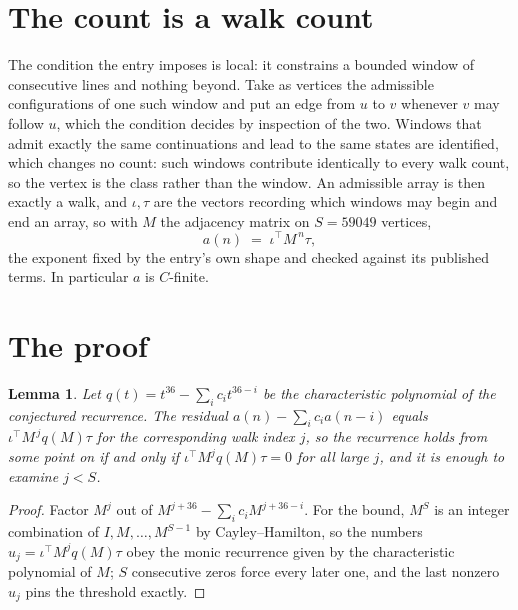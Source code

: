 \documentclass[11pt,a4paper]{article}
\theoremstyle{plain}
\newtheorem{lemma}[theorem]{Lemma}
\theoremstyle{definition}
\begin{document}
\section{The count is a walk count}

The condition the entry imposes is local: it constrains a bounded window of consecutive lines and nothing beyond. Take as vertices the admissible configurations of one such window and put an edge from $u$ to $v$ whenever $v$ may follow $u$, which the condition decides by inspection of the two. Windows that admit exactly the same continuations and lead to the same states are identified, which changes no count: such windows contribute identically to every walk count, so the vertex is the class rather than the window.
An admissible array is then exactly a walk, and $\iota,\tau$ are the vectors recording which windows may begin and end an array, so with $M$ the adjacency matrix on $S=59049$ vertices,
\[
a(n)\;=\;\iota^{\!\top}M^{\,n}\tau ,
\]
the exponent fixed by the entry's own shape and checked against its published terms. In
particular $a$ is $C$-finite.

\section{The proof}

\begin{lemma}\label{lem:crit}
Let $q(t)=t^{36}-\sum_i c_it^{36-i}$ be the characteristic polynomial of the
conjectured recurrence. The residual $a(n)-\sum_ic_ia(n-i)$ equals
$\iota^{\!\top}M^{\,j}q(M)\tau$ for the corresponding walk index $j$, so the recurrence
holds from some point on if and only if $\iota^{\!\top}M^{j}q(M)\tau=0$ for all large $j$,
and it is enough to examine $j<S$.
\end{lemma}

\begin{proof}
Factor $M^{j}$ out of $M^{j+36}-\sum_ic_iM^{j+36-i}$. For the bound, $M^{S}$
is an integer combination of $I,M,\dots,M^{S-1}$ by Cayley--Hamilton, so the numbers
$u_j=\iota^{\!\top}M^{j}q(M)\tau$ obey the monic recurrence given by the characteristic
polynomial of $M$; $S$ consecutive zeros force every later one, and the last nonzero $u_j$
pins the threshold exactly.
\end{proof}
\end{document}
